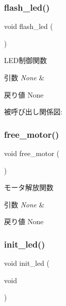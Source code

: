 \subsubsection{\texorpdfstring{flash\_led()}{flash\_led()}}
{\footnotesize\ttfamily void flash\+\_\+led (\begin{DoxyParamCaption}{ }\end{DoxyParamCaption})}



L\+E\+D制御関数 


\begin{DoxyParams}{引数}
{\em None} & \\
\hline
\end{DoxyParams}
\begin{DoxyReturn}{戻り値}
None 
\end{DoxyReturn}
被呼び出し関係図\+:
\mbox{\label{iraira__bo__up__down__mod_8ino_a81f542f98f75dcfd71f410277a1cb3cf}} 
\subsubsection{\texorpdfstring{free\_motor()}{free\_motor()}}
{\footnotesize\ttfamily void free\+\_\+motor (\begin{DoxyParamCaption}{ }\end{DoxyParamCaption})}



モータ解放関数 


\begin{DoxyParams}{引数}
{\em None} & \\
\hline
\end{DoxyParams}
\begin{DoxyReturn}{戻り値}
None 
\end{DoxyReturn}
\mbox{\label{iraira__bo__up__down__mod_8ino_afc227daac655fc74c1537c0555055987}} 
\subsubsection{\texorpdfstring{init\_led()}{init\_led()}}
{\footnotesize\ttfamily void init\+\_\+led (\begin{DoxyParamCaption}\item[{void}]{ }\end{DoxyParamCaption})}




